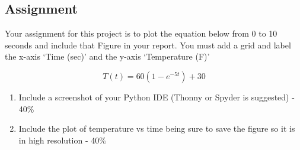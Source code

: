 \subsection{Assignment}

Your assignment for this project is to plot the equation below from 0 to 10 seconds and include that Figure in your report. You must add a grid and label the x-axis ‘Time (sec)’ and the y-axis ‘Temperature (F)’

\begin{equation}
  T(t) = 60(1-e^{-5t})+30
\end{equation}



\begin{enumerate}[itemsep=-5pt]
  \item Include a screenshot of your Python IDE (Thonny or Spyder is suggested) - 40\%
  \item Include the plot of temperature vs time being sure to save the figure so it is in high resolution - 40\%
\end{enumerate}
